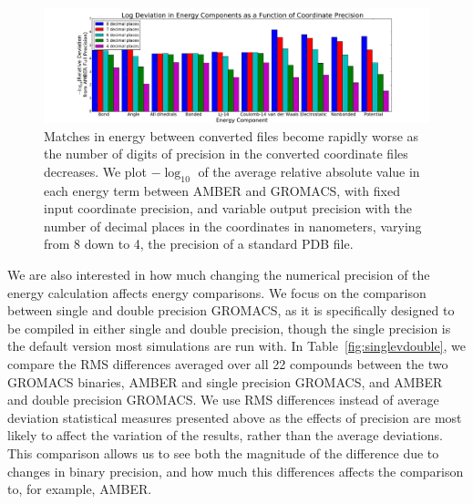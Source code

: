 \begin{figure}[h]
\includegraphics[width=\textwidth]{precisioncomparison.pdf}   
\caption{Matches in energy between converted files become rapidly
  worse as the number of digits of precision in the converted coordinate files
  decreases. We plot $-\log_{10}$ of the average relative absolute
  value in each energy term between AMBER and GROMACS, with fixed
  input coordinate precision, and variable output precision with the
  number of decimal places in the coordinates in nanometers, varying
  from 8 down to 4, the precision of a standard PDB file.
\label{fig:precision}}
\end{figure}

We are also interested in how much changing the numerical precision of
the energy calculation affects energy comparisons.  We focus on the
comparison between single and double precision GROMACS, as it is
specifically designed to be compiled in either single and double
precision, though the single precision is the default version most
simulations are run with. In Table~\ref{fig:singlevdouble}, we compare
the RMS differences averaged over all 22 compounds between the two
GROMACS binaries, AMBER and single precision GROMACS, and AMBER and
double precision GROMACS.  We use RMS differences instead of average
deviation statistical measures presented above as the effects of
precision are most likely to affect the variation of the results,
rather than the average deviations.  This comparison allows us to see
both the magnitude of the difference due to changes in binary
precision, and how much this differences affects the comparison to,
for example, AMBER.

